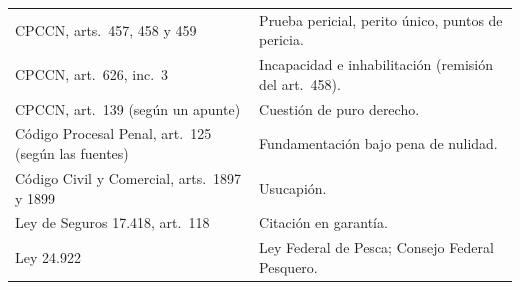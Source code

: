 \documentclass[12pt,oneside]{book}
\begin{document}
\begin{longtable}{>{\raggedright\arraybackslash}p{} >{\raggedright\arraybackslash}p{}}
CPCCN, arts.~457, 458 y 459 & Prueba pericial, perito único, puntos de pericia. \\
CPCCN, art.~626, inc.~3 & Incapacidad e inhabilitación (remisión del art.~458). \\
CPCCN, art.~139 (según un apunte) & Cuestión de puro derecho. %
\\
Código Procesal Penal, art.~125 (según las fuentes) & Fundamentación bajo pena de nulidad. \\
Código Civil y Comercial, arts.~1897 y 1899 & Usucapión. \\
Ley de Seguros 17.418, art.~118 & Citación en garantía. \\
Ley 24.922 & Ley Federal de Pesca; Consejo Federal Pesquero. \\
\end{longtable}
\end{document}
